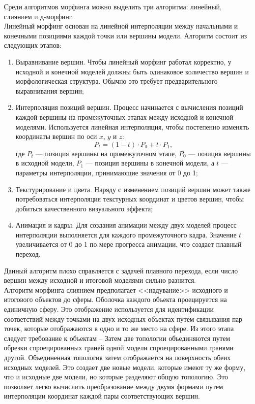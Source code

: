 Среди алгоритмов морфинга можно выделить три алгоритма: линейный, слиянием и д-морфинг.\\

Линейный морфинг основан на линейной интерполяции между начальными и конечными позициями каждой точки или вершины модели. Алгоритм состоит из следующих этапов:

\begin{enumerate}
	\item Выравнивание вершин. Чтобы линейный морфинг работал корректно, у исходной и конечной моделей должны быть одинаковое количество вершин и морфологическая структура. Обычно это требует предварительного выравнивания вершин;
	\item Интерполяция позиций вершин. Процесс начинается с вычисления позиций каждой вершины на промежуточных этапах между исходной и конечной моделями. Используется линейная интерполяция, чтобы постепенно изменять координаты вершин по оси $x$, $y$ и $z$:
	\begin{equation}
		P_{t} = (1 - t) \cdot P_{0} + t \cdot P_{1},
	\end{equation}
	где \( P_{t} \) --- позиция вершины на промежуточном этапе, \( P_{0} \) --- позиция вершины в исходной модели, \( P_{1} \) --- позиция вершины в конечной модели, а \( t \) --- параметры интерполяции, принимающие значения от 0 до 1;
	\item Текстурирование и цвета. Наряду с изменением позиций вершин может также потребоваться интерполяция текстурных координат и цветов вершин, чтобы добиться качественного визуального эффекта;
	\item Анимация и кадры. Для создания анимации между двух моделей процесс интерполяции выполняется для каждого промежуточного кадра. Значение \( t \) увеличивается от 0 до 1 по мере прогресса анимации, что создает плавный переход.
\end{enumerate}

Данный алгоритм плохо справляется с задачей плавного перехода, если число вершин между исходной и итоговой моделями сильно разнится.~\cite{LinearMorph} \\

Алгоритм морфинга слиянием предполагает <<надувание>> исходного и итогового объектов до сферы. Оболочка каждого объекта проецируется на единичную сферу. Это отображение используется для идентификации соответствий между точками на двух исходных объектах путем связывания пар точек, которые отображаются в одно и то же место на сфере. Из этого этапа следует требование к объектам --  Затем две топологии объединяются путем обрезки спроецированных граней одной модели спроецированными гранями другой. Объединенная топология затем отображается на поверхность обеих исходных моделей. Это создает две новые модели, которые имеют ту же форму, что и исходные две модели, но которые разделяют общую топологию. Это позволяет легко вычислить преобразование между двумя формами путем интерполяции координат каждой пары соответствующих вершин.~\cite{Merging_Morph}

